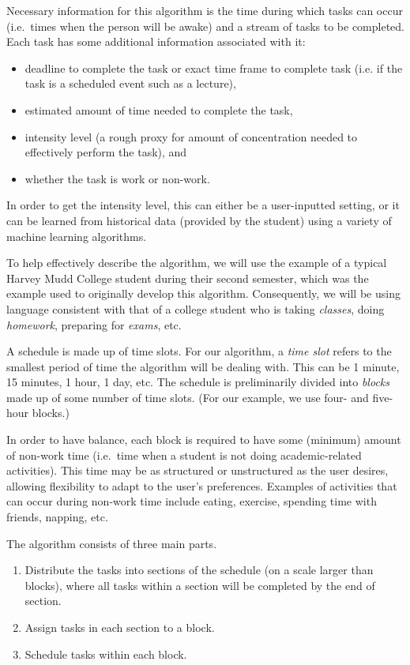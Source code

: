\documentclass{article}
\begin{document}
	Necessary information for this algorithm is the time during which tasks can occur (i.e.~times when the person will be awake) and a stream of tasks to be completed.
	Each task has some additional information associated with it:
	\begin{itemize}
		\item deadline to complete the task or exact time frame to complete task (i.e. if the task is a scheduled event such as a lecture),
		\item estimated amount of time needed to complete the task,
		\item intensity level (a rough proxy for amount of concentration needed to effectively perform the task), and
		\item whether the task is work or non-work.
	\end{itemize}
	In order to get the intensity level, this can either be a user-inputted setting, or it can be learned from historical data (provided by the student) using a variety of machine learning algorithms.

	To help effectively describe the algorithm, we will use the example of a typical Harvey Mudd College student during their second semester, which was the example used to originally develop this algorithm.
	Consequently, we will be using language consistent with that of a college student who is taking \emph{classes}, doing \emph{homework}, preparing for \emph{exams}, etc.

	A schedule is made up of time slots. For our algorithm, a \emph{time slot} refers to the smallest period of time the algorithm will be dealing with. This can be 1 minute, 15 minutes, 1 hour, 1 day, etc.
	The schedule is preliminarily divided into \emph{blocks} made up of some number of time slots.
	(For our example, we use four- and five-hour blocks.)
	
	In order to have balance, each block is required to have some (minimum) amount of non-work time (i.e.~time when a student is not doing academic-related activities). 
	This time may be as structured or unstructured as the user desires, allowing flexibility to adapt to the user's preferences.
	Examples of activities that can occur during non-work time include eating, exercise, spending time with friends, napping, etc.

	The algorithm consists of three main parts.
	\begin{enumerate}
		\item Distribute the tasks into sections of the schedule (on a scale larger than blocks), where all tasks within a section will be completed by the end of section.
		\item Assign tasks in each section to a block. 
		\item Schedule tasks within each block.
	\end{enumerate}
	
\end{document}
